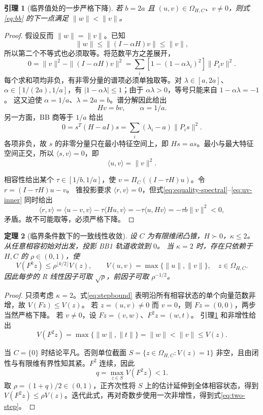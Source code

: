\documentclass[11pt,a4paper,UTF8,fontset=fandol]{ctexart}
\newtheorem{theorem}{定理}[section]
\newtheorem{lemma}[theorem]{引理}
\theoremstyle{remark}\newtheorem{remark}[theorem]{说明}
\newcommand{\ip}[2]{\langle #1,#2\rangle}
\newcommand{\norm}[1]{\lVert #1\rVert}
\begin{document}
\begin{lemma}[临界值处的一步严格下降]\label{lem:strict}
若 $b=2a$ 且 $(u,v)\in\Omega_{H,C}$、$v\ne0$，则式\eqref{eq:bb} 的下一点满足
$\norm w<\norm v$。
\end{lemma}
\begin{proof}
假设反而 $\norm w=\norm v$。已知
\[
 \norm w\le\norm{(I-\alpha H)v}\le\norm v,
\]
所以第二个不等式也必须取等。将范数平方之差展开，
\[
 0=\|v\|^2-\|(I-\alpha H)v\|^2
   =\sum_i[1-(1-\alpha\lambda_i)^2]\|P_i v\|^2.
\]
每个求和项均非负，有非零分量的谱项必须单独取等。对 $\lambda\in[a,2a]$、
$\alpha\in[1/(2a),1/a]$，有 $|1-\alpha\lambda|\le1$；由于
$\alpha\lambda>0$，等号只能来自 $1-\alpha\lambda=-1$。
这又迫使 $\alpha=1/a$、$\lambda=2a=b$。谱分解因此给出
\begin{equation}\label{eq:equality-spectral}
 Hv=bv,\qquad \alpha=1/a.
\end{equation}
另一方面，BB 商等于 \(1/a\) 给出
\[
 0=s^T(H-aI)s=\sum_i(\lambda_i-a)\|P_i s\|^2.
\]
各项非负，故 \(s\) 的非零分量只在最小特征空间上，即 \(Hs=as\)。最小与最大特征空间正交，所以
$\ip{s}{v}=0$，即
\begin{equation}\label{eq:uv-inner}
 \ip{u}{v}=\norm v^2.
\end{equation}

相容性给出某个 $\tau\in[1/b,1/a]$，使
$v=\Pi_C((I-\tau H)u)$。令 $r=(I-\tau H)u-v$。
锥投影要求 $\ip r v=0$，但式\eqref{eq:equality-spectral}--\eqref{eq:uv-inner} 同时给出
\[
 \ip r v
 =\ip{u-v}{v}-\tau\ip{Hu}{v}
 =-\tau\ip{u}{Hv}
 =-\tau b\norm v^2<0,
\]
矛盾。故不可能取等，必须严格下降。
\end{proof}

\begin{theorem}[临界条件数下的一致线性收敛]\label{thm:bb-convergence}
设 $C$ 为有限维闭凸锥，$H\succ0$，$\kappa\le2$。从任意相容初始对出发，投影 BB1 轨道收敛到 $0$。
当 $\kappa=2$ 时，存在只依赖于 $H,C$ 的 $\rho\in(0,1)$，使
\begin{equation}\label{eq:two-step}
 V(F^kz)\le\rho^{\lfloor k/2\rfloor}V(z),\qquad
 V(u,v)=\max\{\norm u,\norm v\},\quad z\in\Omega_{H,C}.
\end{equation}
因此每步的 R 线性因子可取 $\sqrt\rho$，前因子可取 $\rho^{-1/2}$。
\end{theorem}
\begin{proof}
只须考虑 $\kappa=2$。式\eqref{eq:stepbound} 表明沿所有相容状态的单个向量范数非增，故 $V(Fz)\le V(z)$。
若 $z=(u,v)\ne0$ 而 $v=0$，则 $Fz=(0,0)$，两步当然严格下降。
若 $v\ne0$，设 $Fz=(v,w)$、$F^2z=(w,t)$。
引理\ref{lem:strict} 和非增性给出
\[
 V(F^2z)=\max\{\norm w,\norm t\}=\norm w
 <\norm v\le V(z).
\]

当 $C=\{0\}$ 时结论平凡。否则单位截面
$S=\{z\in\Omega_{H,C}:V(z)=1\}$ 非空，且由闭性与有限维有界性知其紧。$F^2$ 连续，因此
\[
 q=\max_{z\in S}V(F^2z)<1.
\]
取 $\rho=(1+q)/2\in(0,1)$，正齐次性将 $S$ 上的估计延伸到全体相容状态，得到
$V(F^2z)\le\rho V(z)$。迭代此式，再对奇数步使用一次非增性，得到式\eqref{eq:two-step}。
\end{proof}
\end{document}
